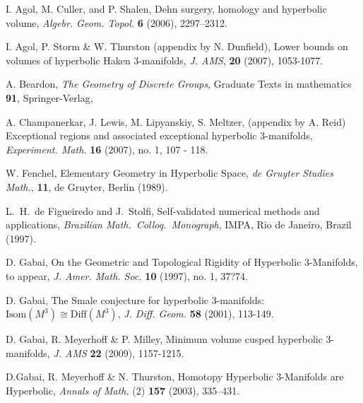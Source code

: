 \def\bibline{\hbox to30pt{\hrulefill}}

\begin{thebibliography}{GHMTY}


 I. Agol, M. Culler, and P. Shalen, Dehn surgery, homology and hyperbolic volume,
\textit {Algebr. Geom. Topol.} \textbf {6} (2006), 2297--2312.

 I. Agol, P. Storm \& W. Thurston (appendix by N. Dunfield), Lower bounds on volumes of hyperbolic Haken 3-manifolds, \textit {J. AMS}, \textbf {20} (2007), 1053-1077. 

  A. Beardon, \textit {The Geometry of Discrete Groups}, Graduate Texts in mathematics \textbf {91}, Springer-Verlag, 



 A. Champanerkar, J.  Lewis, M. Lipyanskiy, S. Meltzer, (appendix by A. Reid)
Exceptional regions and associated exceptional hyperbolic 3-manifolds, \textit {Experiment. Math.} \textbf {16} (2007), no. 1, 107 - 118.

  W. Fenchel,  Elementary Geometry in Hyperbolic Space, \textit {de Gruyter Studies Math.}, \textbf {11}, de Gruyter, Berlin (1989).


 L.\ H.\ de Figueiredo and J.\ Stolfi, Self-validated
numerical methods and applications, \textit {Brazilian Math.\  Colloq.\  Monograph}, IMPA, Rio de Janeiro, Brazil (1997).

 
  
 

 D. Gabai, On the Geometric and Topological Rigidity of Hyperbolic 3-Manifolds,  to appear, \textit {J. Amer. Math. Soc.\/}  \textbf {10} (1997), no. 1, 37?74.

 D. Gabai, The Smale conjecture for hyperbolic 3-manifolds:  $\mathrm {Isom}(M^3) \cong \mathrm{Diff} (M^3)$, \textit {J. Diff. Geom.}  \textbf {58} (2001), 113-149.


 D. Gabai, R. Meyerhoff \& P. Milley, Minimum volume cusped hyperbolic 3-manifolds, \textit {J. AMS} \textbf {22} (2009), 1157-1215.

 D.Gabai, R. Meyerhoff \& N. Thurston, Homotopy Hyperbolic 3-Manifolds are Hyperbolic, \textit {Annals of Math.} (2) \textbf {157} (2003), 335--431.


\end{thebibliography}
